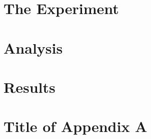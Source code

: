 \documentclass[11pt]{ksudiss}                          %
\begin{document}
\chapter{\bf{The Experiment}}    %
\setcounter{figure}{0}
\setcounter{table}{0}
\setcounter{equation}{0}


\chapter{\bf{Analysis}}    %
\setcounter{figure}{0}
\setcounter{table}{0}
\setcounter{equation}{0}


\chapter{\bf{Results}}    %
\setcounter{figure}{0}
\setcounter{table}{0}
\setcounter{equation}{0}



\begin{thebibliography}{100}

\end{thebibliography}




% 


\appendix

\chapter{Title of Appendix A}
\setcounter{figure}{0}
\setcounter{table}{0}
\setcounter{equation}{0}

\end{document}
